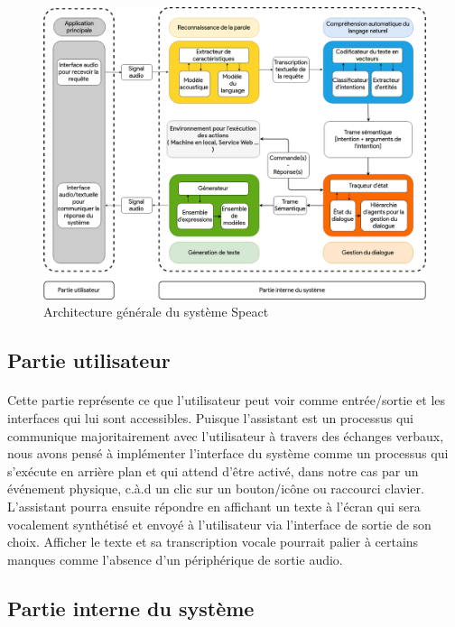 \begin{figure}[H]
	\centering
	\includegraphics[width=\linewidth]{images/SPA_architecture.png}
	\caption{Architecture générale du système Speact}
	\label{spaArch}
\end{figure}


	\subsection{Partie utilisateur}
	\paragraph{}
	Cette partie représente ce que l'utilisateur peut voir comme entrée/sortie et les interfaces qui lui sont accessibles. Puisque l'assistant est un processus qui communique majoritairement avec l'utilisateur à travers des échanges verbaux, nous avons pensé à implémenter l'interface du système comme un processus qui s'exécute en arrière plan et qui attend d'être activé, dans notre cas par un événement physique, c.à.d un clic sur un bouton/icône ou raccourci clavier. L'assistant pourra ensuite répondre en affichant un texte à l'écran qui sera vocalement synthétisé et envoyé à l'utilisateur via l'interface de sortie de son choix. Afficher le texte et sa transcription vocale pourrait palier à certains manques comme l'absence d'un périphérique de sortie audio.
	\subsection{Partie interne du système}
	
